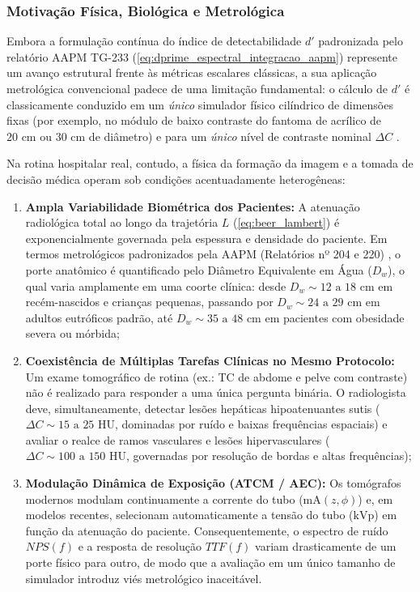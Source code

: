 \documentclass[
  12pt,
  a4paper,
  oneside
]{report}
\begin{document}
\subsubsection{Motivação Física, Biológica e Metrológica}
Embora a formulação contínua do índice de detectabilidade $d'$ padronizada pelo relatório AAPM TG-233 (\cref{eq:dprime_espectral_integracao_aapm}) represente um avanço estrutural frente às métricas escalares clássicas, a sua aplicação metrológica convencional padece de uma limitação fundamental: o cálculo de $d'$ é classicamente conduzido em um \emph{único} simulador físico cilíndrico de dimensões fixas (por exemplo, no módulo de baixo contraste do fantoma de acrílico de $20\text{ cm}$ ou $30\text{ cm}$ de diâmetro) e para um \emph{único} nível de contraste nominal $\Delta C$ \cite{aapm_tg233_2019, fitton2026}.

Na rotina hospitalar real, contudo, a física da formação da imagem e a tomada de decisão médica operam sob condições acentuadamente heterogêneas:
\begin{enumerate}
  \item \textbf{Ampla Variabilidade Biométrica dos Pacientes:} A atenuação radiológica total ao longo da trajetória $L$ (\cref{eq:beer_lambert}) é exponencialmente governada pela espessura e densidade do paciente. Em termos metrológicos padronizados pela AAPM (Relatórios nº 204 e 220) \cite{aapm_report204}, o porte anatômico é quantificado pelo Diâmetro Equivalente em Água ($D_w$), o qual varia amplamente em uma coorte clínica: desde $D_w \sim 12\text{ a } 18\text{ cm}$ em recém-nascidos e crianças pequenas, passando por $D_w \sim 24\text{ a } 29\text{ cm}$ em adultos eutróficos padrão, até $D_w \sim 35\text{ a } 48\text{ cm}$ em pacientes com obesidade severa ou mórbida;
  \item \textbf{Coexistência de Múltiplas Tarefas Clínicas no Mesmo Protocolo:} Um exame tomográfico de rotina (ex.: TC de abdome e pelve com contraste) não é realizado para responder a uma única pergunta binária. O radiologista deve, simultaneamente, detectar lesões hepáticas hipoatenuantes sutis ($\Delta C \sim 15\text{ a } 25\text{ HU}$, dominadas por ruído e baixas frequências espaciais) e avaliar o realce de ramos vasculares e lesões hipervasculares ($\Delta C \sim 100\text{ a } 150\text{ HU}$, governadas por resolução de bordas e altas frequências);
  \item \textbf{Modulação Dinâmica de Exposição (ATCM / AEC):} Os tomógrafos modernos modulam continuamente a corrente do tubo ($\text{mA}(z, \phi)$) e, em modelos recentes, selecionam automaticamente a tensão do tubo ($\text{kVp}$) em função da atenuação do paciente. Consequentemente, o espectro de ruído $NPS(f)$ e a resposta de resolução $TTF(f)$ variam drasticamente de um porte físico para outro, de modo que a avaliação em um único tamanho de simulador introduz viés metrológico inaceitável.
\end{enumerate}
\end{document}
